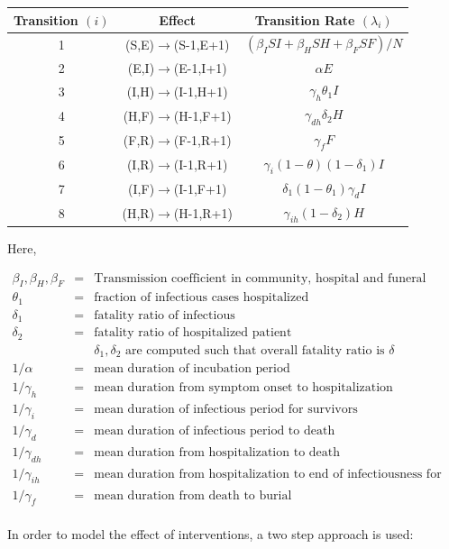 \documentclass[10pt, journal,onecolumn]{IEEEtran}
\begin{document}
\begin{center}
\begin{tabular}{|c|c|c|}
\hline 
Transition $(i)$ & Effect & Transition Rate $(\lambda_i)$ \tabularnewline
\hline 
\hline 
1 & (S,E)$\to$(S-1,E+1) & $(\beta_{I}SI+\beta_{H}SH+\beta_{F}SF)/N$\tabularnewline
\hline 
2 & (E,I)$\to$(E-1,I+1) & $\alpha E$\tabularnewline
\hline 
3 & (I,H)$\to$(I-1,H+1) & $\gamma_{h}\theta_{1}I$\tabularnewline
\hline 
4 & (H,F)$\to$(H-1,F+1) & $\gamma_{dh}\delta_{2}H$\tabularnewline
\hline 
5 & (F,R)$\to$(F-1,R+1) & $\gamma_{f}F$\tabularnewline
\hline 
6 & (I,R)$\to$(I-1,R+1) & $\gamma_{i}(1-\theta)(1-\delta_{1})I$\tabularnewline
\hline 
7 & (I,F)$\to$(I-1,F+1) & $\delta_{1}(1-\theta_{1})\gamma_{d}I$\tabularnewline
\hline 
8 & (H,R)$\to$(H-1,R+1) & $\gamma_{ih}(1-\delta_{2})H$\tabularnewline
\hline 
\end{tabular}
\end{center}

Here,

\begin{eqnarray*}
\beta_I, \beta_H, \beta_F &=& \text{Transmission coefficient in community, hospital and funeral respectively}\\
\theta_1 &=& \text{fraction of infectious cases hospitalized}\\
\delta_1 &=& \text{fatality ratio of infectious}\\
\delta_2 &=& \text{fatality ratio of hospitalized patient}\\
&& \delta_1, \delta_2 \text{ are computed such that overall fatality ratio is $\delta$}\\
1/\alpha &=& \text{mean duration of incubation period}\\
1/\gamma_h &=& \text{mean duration from symptom onset to hospitalization}\\
1/\gamma_{i} &=& \text{mean duration of infectious period for survivors}\\
1/\gamma_{d} &=& \text{mean duration of infectious period to death}\\
1/\gamma_{dh} &=& \text{mean duration from hospitalization to death}\\
1/\gamma_{ih} &=& \text{mean duration from hospitalization to end of infectiousness for survivors}\\
1/\gamma_{f} &=& \text{mean duration from death to burial}\\
\end{eqnarray*}

In order to model the effect of interventions, a two step approach is used:
\end{document}
